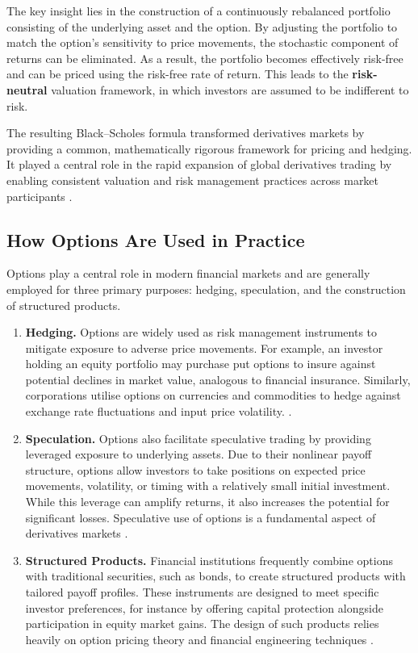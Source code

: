 \documentclass[12pt]{article}
\begin{document}
The key insight lies in the construction of a continuously rebalanced portfolio consisting of the underlying asset and the option. By adjusting the portfolio to match the option’s sensitivity to price movements, the stochastic component of returns can be eliminated. As a result, the portfolio becomes effectively risk-free and can be priced using the risk-free rate of return. This leads to the \textbf{risk-neutral} valuation framework, in which investors are assumed to be indifferent to risk.

The resulting Black–Scholes formula transformed derivatives markets by providing a common, mathematically rigorous framework for pricing and hedging. It played a central role in the rapid expansion of global derivatives trading by enabling consistent valuation and risk management practices across market participants \cite{ijfs12040114}.

\subsection{How Options Are Used in Practice}
Options play a central role in modern financial markets and are generally employed for three primary purposes: hedging, speculation, and the construction of structured products.

\begin{enumerate}[leftmargin=2em, itemsep=4pt]
\item \textbf{Hedging.}
Options are widely used as risk management instruments to mitigate exposure to adverse price movements. For example, an investor holding an equity portfolio may purchase put options to insure against potential declines in market value, analogous to financial insurance. Similarly, corporations utilise options on currencies and commodities to hedge against exchange rate fluctuations and input price volatility. \cite{bartram2006use, hull2018}.

\item \textbf{Speculation.}
Options also facilitate speculative trading by providing leveraged exposure to underlying assets. Due to their nonlinear payoff structure, options allow investors to take positions on expected price movements, volatility, or timing with a relatively small initial investment. While this leverage can amplify returns, it also increases the potential for significant losses. Speculative use of options is a fundamental aspect of derivatives markets \cite{hull2018}.

\item \textbf{Structured Products.}
Financial institutions frequently combine options with traditional securities, such as bonds, to create structured products with tailored payoff profiles. These instruments are designed to meet specific investor preferences, for instance by offering capital protection alongside participation in equity market gains. The design of such products relies heavily on option pricing theory and financial engineering techniques \cite{hull2018, taylor2005asset}.
\end{enumerate}
\end{document}
